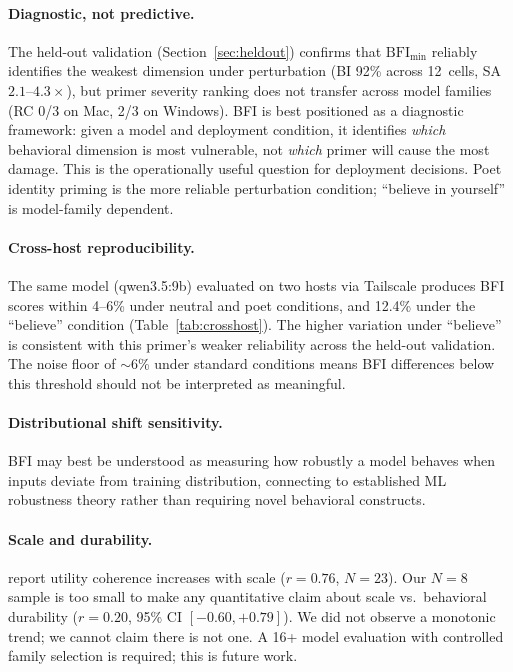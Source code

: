 \documentclass[11pt,a4paper]{article}
\begin{document}
\paragraph{Diagnostic, not predictive.}
The held-out validation (Section~\ref{sec:heldout}) confirms that $\text{BFI}_{\min}$ reliably identifies the weakest dimension under perturbation (BI 92\% across 12~cells, SA $2.1$--$4.3\times$), but primer severity ranking does not transfer across model families (RC 0/3 on Mac, 2/3 on Windows). BFI is best positioned as a diagnostic framework: given a model and deployment condition, it identifies \emph{which} behavioral dimension is most vulnerable, not \emph{which} primer will cause the most damage. This is the operationally useful question for deployment decisions. Poet identity priming is the more reliable perturbation condition; ``believe in yourself'' is model-family dependent.

\paragraph{Cross-host reproducibility.}
The same model (qwen3.5:9b) evaluated on two hosts via Tailscale produces BFI scores within 4--6\% under neutral and poet conditions, and 12.4\% under the ``believe'' condition (Table~\ref{tab:crosshost}). The higher variation under ``believe'' is consistent with this primer's weaker reliability across the held-out validation. The noise floor of ${\sim}$6\% under standard conditions means BFI differences below this threshold should not be interpreted as meaningful.

\paragraph{Distributional shift sensitivity.}
BFI may best be understood as measuring how robustly a model behaves when inputs deviate from training distribution, connecting to established ML robustness theory rather than requiring novel behavioral constructs.

\paragraph{Scale and durability.}
\citet{mazeika2025utility} report utility coherence increases with scale ($r = 0.76$, $N = 23$). Our $N = 8$ sample is too small to make any quantitative claim about scale vs.\ behavioral durability ($r = 0.20$, 95\% CI $[-0.60, +0.79]$). We did not observe a monotonic trend; we cannot claim there is not one. A 16+ model evaluation with controlled family selection is required; this is future work.
\end{document}
